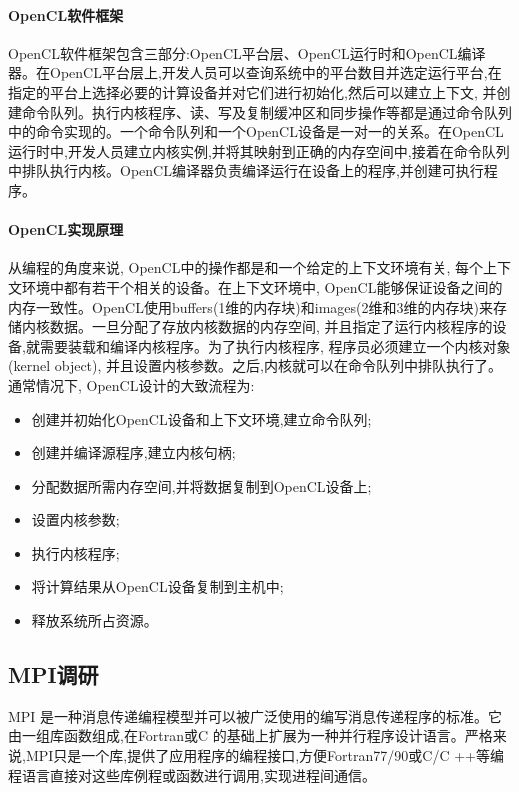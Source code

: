 \documentclass[paper=a4]{ctexart} %
\numberwithin{equation}{section} %
\numberwithin{figure}{section} %
\numberwithin{table}{section} %
\begin{document}
\paragraph{OpenCL软件框架}OpenCL软件框架包含三部分:OpenCL平台层、OpenCL运行时和OpenCL编译器。在OpenCL平台层上,开发人员可以查询系统中的平台数目并选定运行平台,在指定的平台上选择必要的计算设备并对它们进行初始化,然后可以建立上下文, 并创建命令队列。执行内核程序、读、写及复制缓冲区和同步操作等都是通过命令队列中的命令实现的。一个命令队列和一个OpenCL设备是一对一的关系。在OpenCL运行时中,开发人员建立内核实例,并将其映射到正确的内存空间中,接着在命令队列中排队执行内核。OpenCL编译器负责编译运行在设备上的程序,并创建可执行程序。

\paragraph{OpenCL实现原理}

从编程的角度来说, OpenCL中的操作都是和一个给定的上下文环境有关, 每个上下文环境中都有若干个相关的设备。在上下文环境中, OpenCL能够保证设备之间的内存一致性。OpenCL使用buffers(1维的内存块)和images(2维和3维的内存块)来存储内核数据。一旦分配了存放内核数据的内存空间, 并且指定了运行内核程序的设备,就需要装载和编译内核程序。为了执行内核程序, 程序员必须建立一个内核对象(kernel object), 并且设置内核参数。之后,内核就可以在命令队列中排队执行了。通常情况下, OpenCL设计的大致流程为:
\begin{itemize}
\item 创建并初始化OpenCL设备和上下文环境,建立命令队列;
\item 创建并编译源程序,建立内核句柄;
\item 分配数据所需内存空间,并将数据复制到OpenCL设备上;
\item 设置内核参数; 
\item 执行内核程序;
\item 将计算结果从OpenCL设备复制到主机中;
\item 释放系统所占资源。
\end{itemize}

\subsection{MPI调研}

MPI 是一种消息传递编程模型并可以被广泛使用的编写消息传递程序的标准。它由一组库函数组成,在Fortran或C 的基础上扩展为一种并行程序设计语言。严格来说,MPI只是一个库,提供了应用程序的编程接口,方便Fortran77/90或C/C ++等编程语言直接对这些库例程或函数进行调用,实现进程间通信。
\end{document}

